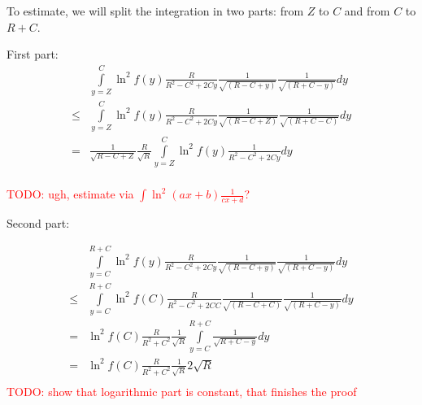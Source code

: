 \documentclass[12pt, a4paper]{article}
\newcommand{\todo}[1]{{\large \textcolor{red}{TODO: #1}}}
\begin{document}
To estimate, we will split the integration in two parts: from $Z$ to $C$ and from $C$ to $R + C$.

First part:
\begin{align*} 
    & \int\limits_{y = Z}^{C} \ln^2 f(y) \frac{R}{R^2 - C^2 + 2 C y} \frac{1}{\sqrt{(R - C + y)}} \frac{1}{\sqrt{(R + C - y)}} dy\\
\le & \int\limits_{y = Z}^{C} \ln^2 f(y) \frac{R}{R^2 - C^2 + 2 C y} \frac{1}{\sqrt{(R - C + Z)}} \frac{1}{\sqrt{(R + C - C)}} dy\\
=   & \frac{1}{\sqrt{R - C + Z}} \frac{R}{\sqrt{R}}  \int\limits_{y = Z}^{C} \ln^2 f(y) \frac{1}{R^2 - C^2 + 2 C y} dy\\
\end{align*}

\todo{ugh, estimate via $\int \ln^2(a x + b) \frac{1}{c x + d}$? }

Second part:

\begin{align*}
    & \int\limits_{y = C}^{R + C} \ln^2 f(y) \frac{R}{R^2 - C^2 + 2 C y} \frac{1}{\sqrt{(R - C + y)}} \frac{1}{\sqrt{(R + C - y)}} dy\\
\le & \int\limits_{y = C}^{R + C} \ln^2 f(C) \frac{R}{R^2 - C^2 + 2 C C} \frac{1}{\sqrt{(R - C + C)}} \frac{1}{\sqrt{(R + C - y)}} dy\\
=   & \ln^2 f(C) \frac{R}{R^2 + C^2} \frac{1}{\sqrt{R}} \int\limits_{y = C}^{R + C} \frac{1}{\sqrt{R + C - y}} dy\\
=   & \ln^2 f(C) \frac{R}{R^2 + C^2} \frac{1}{\sqrt{R}} 2 \sqrt{R}\\
\end{align*}
\todo{show that logarithmic part is constant, that finishes the proof}
\end{document}
